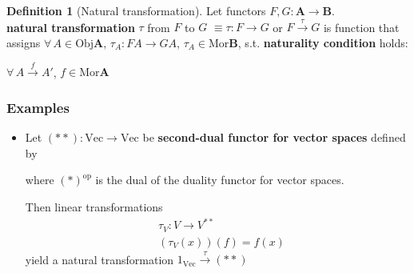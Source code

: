 \documentclass[twoside,landscape,10pt]{amsart}
\theoremstyle{plain}
\theoremstyle{definition}
\newtheorem{definition}{Definition}
\theoremstyle{remark}
\begin{document}
\begin{multicols*}{2}
\begin{definition}[Natural transformation]
  Let functors $F,G : \mathbf{A} \to \mathbf{B}$.  \\
\textbf{natural transformation} $\tau$ from $F$ to $G$ $\equiv \tau : F\to G$ or $F\xrightarrow{ \tau} G$ is function that assigns $\forall \, A \in \text{Obj}\mathbf{A}$, $\tau_A:FA \to GA$, $\tau_A \in \text{Mor}\mathbf{B}$, s.t. \textbf{naturality condition} holds:

$\forall \, A \xrightarrow{f} A'$, $f\in \text{Mor}\mathbf{A}$


\end{definition}


\subsubsection{Examples}

\begin{itemize}
  \item Let $(**):\text{Vec}\to \text{Vec}$ be \textbf{ second-dual functor for vector spaces } defined by 


where $(*)^{\text{op}}$ is the dual of the duality functor for vector spaces.  

Then linear transformations 
\[
\begin{aligned}
  & \tau_V: V \to V^{**} \\ 
  & (\tau_V(x))(f) = f(x)
\end{aligned}
\]
yield a natural transformation $1_{\text{Vec}} \xrightarrow{ \tau } (**)$


\end{itemize}
\end{multicols*}
\end{document}
